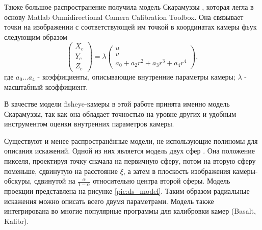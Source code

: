Также большое распространение получила модель Скарамуззы \cite{scaramuzza}, которая легла в основу Matlab Omnidirectional 
Camera Calibration Toolbox. Она связывает точки на изображении с соответствующей им точкой в координатах камеры фьук
следующим образом
\begin{equation}	
    \begin{pmatrix}X_c\\Y_c\\Z_c\end{pmatrix} = \lambda \begin{pmatrix}u\\v\\a_0 + a_2 r^2 + a_3 r^3 + a_4 r^4\end{pmatrix},
    \label{eqn:scaramuzza}
\end{equation}
где $a_0 ... a_4$ - коэффициенты, описывающие внутренние параметры камеры; $\lambda$ - масштабный коэффициент.

В качестве модели fisheye-камеры в этой работе принята именно модель Скарамуззы, так как она обладает точностью на уровне 
других \cite{double_sphere} и удобным инструментом оценки внутренних параметров камеры.


Существуют и менее распространённые модели, не использующие полиномы для описания искажений. Одной из них является
модель двух сфер \cite{double_sphere}. %
Она положение пикселя, проектируя точку сначала на первичную сферу, потом на вторую сферу поменьше, сдвинутую на 
расстояние $\xi$, а затем в плоскость изображения камеры-обскуры, сдвинутой на $\frac{\alpha}{1-\alpha}$ относительно 
центра второй сферы. Модель проекции представлена на рисунке \ref{pic:ds_model}. Таким образом радиальные искажения 
можно описать всего двумя параметрами. Модель также интегрирована
во многие популярные программы для калибровки камер (Basalt, Kalibr).




 